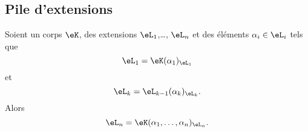 \subsection{Pile d'extensions}

\begin{lemma}        \label{LEMooTURZooXnjmjT}
	Soient un corps \( \eK\), des extensions \( \eL_1\),\ldots, \( \eL_n\) et des éléments \( \alpha_i\in \eL_i\) tels que
	\begin{equation}    \label{EQooOCQSooFMkzTc}
		\eL_1=\eK(\alpha_1)_{\eL_1}
	\end{equation}
	et
	\begin{equation}
		\eL_k=\eL_{k-1}(\alpha_k)_{\eL_k}.
	\end{equation}
	Alors
	\begin{equation}
		\eL_n=\eK(\alpha_1,\ldots, \alpha_n)_{\eL_n}.
	\end{equation}
\end{lemma}

